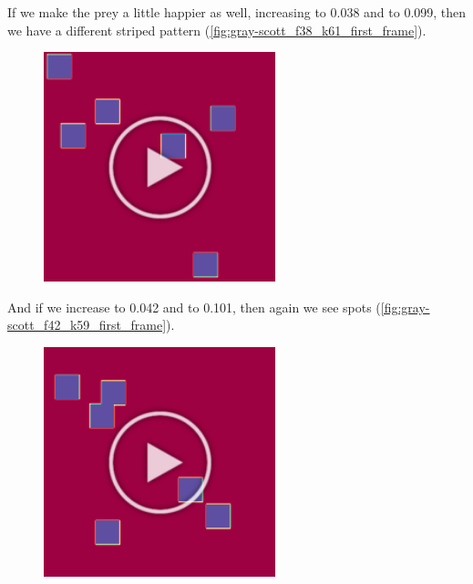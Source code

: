 If we make the prey a little happier as well, increasing   to 0.038 and  to 0.099, then we have a different striped pattern (\autoref{fig:gray-scott_f38_k61_first_frame}).\\

\begin{figure}[h]
\centering
\mySfFamily
\includegraphics[width = 0.6\textwidth]{../images/gray-scott_f38_k61_first_frame.png}
\caption{}
\label{fig:gray-scott_f38_k61_first_frame}
\end{figure}

And if we increase  to 0.042 and  to 0.101, then again we see spots (\autoref{fig:gray-scott_f42_k59_first_frame}).\\

\begin{figure}[h]
\centering
\mySfFamily
\includegraphics[width = 0.6\textwidth]{../images/gray-scott_f42_k59_first_frame.png}
\caption{}
\label{fig:gray-scott_f42_k59_first_frame}
\end{figure}

